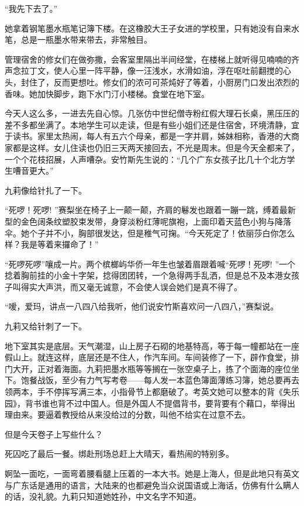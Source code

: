 \par “我先下去了。”
\par 她拿着钢笔墨水瓶笔记簿下楼。在这橡胶大王子女进的学校里，只有她没有自来水笔，总是一瓶墨水带来带去，非常触目。
\par 管理宿舍的修女们在做弥撒，会客室里隔出半间经堂，在楼梯上就听得见喃喃的齐声念拉丁文，使人心里一阵平静，像一汪浅水，水滑如油，浮在呕吐前翻搅的心头，封住了，反而更想吐。修女们的浓可可茶炖好了等着，小厨房门口发出浓烈的香味。她加快脚步，跑下水门汀小楼梯。食堂在地下室。
\par 今天人这么多，一进去先自心惊。几张仿中世纪僧寺粉红假大理石长桌，黑压压的差不多都坐满了。本地学生可以走读，但是有些小姐们还是住宿舍，环境清静，宜于读书。家里太热闹，每人有五六个母亲，都是一字并肩，姊妹相称，香港的大商家都是这样。女儿住读也仍旧三天两天接回去，不光是周末。但是今天全都来了，一个个花枝招展，人声嘈杂。安竹斯先生说的：“几个广东女孩子比几十个北方学生嘈音更大。”
\par 九莉像给针扎了一下。
\par “死啰！死啰! ”赛梨坐在椅子上一颠一颠，齐肩的鬈发也跟着一蹦一跳，缚着最新型的金色阔条纹塑胶束发带，身穿淡粉红薄呢旗袍，上面印着天蓝色小狗与降落伞。她个子并不小，胸部很发达，但是稚气可掬。“今天死定了！依丽莎白你怎么样？我是等着来攞命了！”
\par “死啰死啰”嚷成一片。两个槟榔屿华侨一年生也皱着眉跟着喊“死啰！死啰! ”一个捻着胸前挂的小金十字架，捻得团团转，一个急得两手乱洒，但是总不及本港女孩子叫得实大声洪，而又毫无诚意，不会使人误会她们是真不得了。
\par “嗳，爱玛，讲点一八四八给我听，他们说安竹斯喜欢问一八四八，”赛梨说。
\par 九莉又给针刺了一下。
\par 地下室其实是底层。天气潮湿，山上房子石砌的地基特高，等于每一幢都站在一座假山上。就连这样，底层还是不住人，作汽车间。车间装修了一下，辟作食堂，排门大开，正对着海面。九莉把墨水瓶等等搁在一张空桌子上，拣了个面海的座位坐下。饱餐战饭，至少有力气写考卷——每人发一本蓝色簿面薄练习簿，她总要再去领两本，手不停挥写满三本，小指骨节上都磨破了。考英文她可以整本的背《失乐园》，背书谁也背不过中国人。但是外国人不提倡背书，要背要有个藉口，举得出理由来。要逼着教授给从来没给过的分数，叫他不给实在过意不去。
\par 但是今天卷子上写些什么？
\par 死囚吃了最后一餐。绑赴刑场总赶上大晴天，看热闹的特别多。
\par 婀坠一面吃，一面弯着腰看腿上压着的一本大书。她是上海人，但是此地只有英文与广东话是通用的语言，大陆来的也都避免当众说国语或上海话，仿佛有什么瞒人的话，没礼貌。九莉只知道她姓孙，中文名字不知道。
